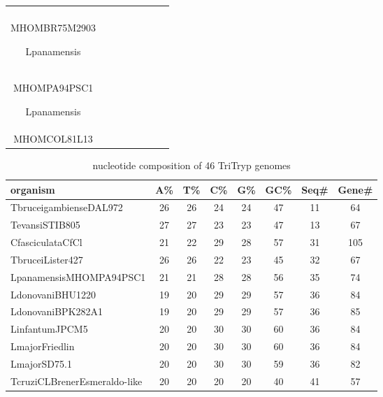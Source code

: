 \documentclass[table,
12pt, %
a4paper, %
oneside, %
headinclude,footinclude, %
BCOR5mm, %
]{scrartcl}
\begin{document}
\begin{table}[hbt]
\begin{adjustbox}{width=\columnwidth,center}
\begin{tabular}{|c|c|c|c|c|c|c|c|}
{\begin{enumerate}
          \item Lbraziliensis\\MHOMBR75M2903
          \item Lpanamensis\\MHOMPA94PSC1
          \item Lpanamensis\\MHOMCOL81L13
        \end{enumerate}} \\
      \bottomrule
    \end{tabular}
    \label{table:Genomeclusters1}
  \end{adjustbox}
\end{table}

\newpage

\begin{table}[htbp]
  \caption{nucleotide composition of 46 TriTryp genomes}
  \begin{adjustbox}{center}
    \begin{tabular}{|l|ccccccc|}\hline\hline
      organism                         & A\% & T\% & C\% & G\% & GC\% & Seq\# & Gene\# \\
      \hline
      TbruceigambienseDAL972           & 26  & 26  & 24  & 24  & 47   & 11    & 64     \\
      TevansiSTIB805                   & 27  & 27  & 23  & 23  & 47   & 13    & 67     \\
      CfasciculataCfCl                 & 21  & 22  & 29  & 28  & 57   & 31    & 105    \\
      TbruceiLister427                 & 26  & 26  & 22  & 23  & 45   & 32    & 67     \\
      LpanamensisMHOMPA94PSC1          & 21  & 21  & 28  & 28  & 56   & 35    & 74     \\
      LdonovaniBHU1220                 & 19  & 20  & 29  & 29  & 57   & 36    & 84     \\
      LdonovaniBPK282A1                & 19  & 20  & 29  & 29  & 57   & 36    & 85     \\
      LinfantumJPCM5                   & 20  & 20  & 30  & 30  & 60   & 36    & 84     \\
      LmajorFriedlin                   & 20  & 20  & 30  & 30  & 60   & 36    & 84     \\
      LmajorSD75.1                     & 20  & 20  & 30  & 30  & 59   & 36    & 82     \\
      TcruziCLBrenerEsmeraldo-like     & 20  & 20  & 20  & 20  & 40   & 41    & 57     \\

\end{tabular}
\end{adjustbox}
\end{table}
\end{document}
